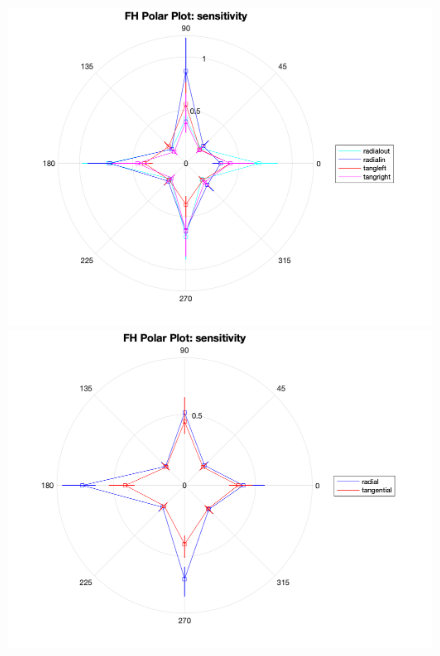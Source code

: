 \documentclass[11pt]{article} %
\begin{document}
\begin{figure}[H]
\centering %
\includegraphics[scale=.3]{Images/FH_PP_sensitivity_Alldata_4conds.png}
\includegraphics[scale=.3]{Images/FH_PP_sensitivity_Alldata_2conds.png}
\end{figure}
\end{document}
